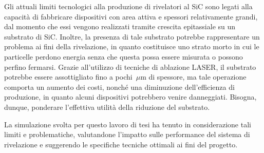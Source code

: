 


Gli attuali limiti tecnologici alla produzione di rivelatori al SiC sono legati alla capacità di fabbricare dispositivi con area attiva e spessori relativamente grandi, dal momento che essi vengono realizzati tramite crescita epitassiale su un substrato di SiC.
Inoltre, la presenza di tale substrato potrebbe rappresentare un problema ai fini della rivelazione, in quanto costituisce uno strato morto in cui le particelle perdono energia senza che questa possa essere misurata o possono perfino fermarsi.
Grazie all'utilizzo di tecniche di ablazione LASER, il substrato potrebbe essere assottigliato fino a pochi~$\mu$m di spessore, ma tale operazione comporta un aumento dei costi, nonché una diminuzione dell'efficienza di produzione, in quanto alcuni dispositivi potrebbero venire danneggiati.
Bisogna, dunque, ponderare l'effettiva utilità della riduzione del substrato.

La simulazione svolta per questo lavoro di tesi ha tenuto in considerazione tali limiti e problematiche, valutandone l'impatto sulle performance del sistema di rivelazione e suggerendo le specifiche tecniche ottimali ai fini del progetto. 











